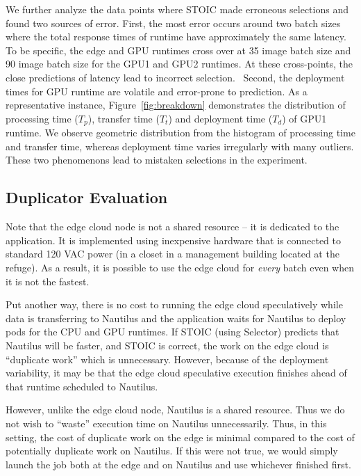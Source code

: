 We further analyze the data points where STOIC made erroneous selections and found two sources of error. First, the most error occurs around two batch sizes where the total response times of runtime have approximately the same latency. To be specific, the edge and GPU runtimes cross over at 35 image batch size and 90 image batch size for the GPU1 and GPU2 runtimes. At these cross-points, the close predictions of latency lead to incorrect selection.~\cite{ref:stoic2020} Second, the deployment times for GPU runtime are volatile and error-prone to prediction. As a representative instance, Figure~\ref{fig:breakdown} demonstrates the distribution of processing time ($T_p$), transfer time ($T_t$) and deployment time ($T_d$) of GPU1 runtime. We observe geometric distribution from the histogram of processing time and transfer time, whereas deployment time varies irregularly with many outliers. These two phenomenons lead to mistaken selections in the experiment.

\subsection{Duplicator Evaluation}

Note that the edge cloud node is not a shared resource -- it is dedicated to the application. It is implemented using inexpensive hardware that is connected to standard 120 VAC power (in a closet in a management building located at the refuge).
As a result, it is possible to use the edge cloud for \textit{every} batch even when it is not the fastest.  

Put another way, there is no cost to running the edge cloud speculatively while data is transferring to Nautilus and the application waits for Nautilus to deploy pods for the CPU and GPU runtimes. If STOIC (using Selector) predicts that Nautilus will be faster, and STOIC is correct, the work on the edge cloud is ``duplicate work'' which is unnecessary. However, because of the deployment variability, it may be that the edge cloud speculative execution finishes ahead of that runtime scheduled to Nautilus.

However, unlike the edge cloud node, Nautilus is a shared resource.  Thus we do not wish to ``waste'' execution time on Nautilus unnecessarily. Thus, in this setting, the cost of duplicate work on the edge is minimal compared to the cost of potentially duplicate work on Nautilus. If this were not true, we would simply launch the job both at the edge and on Nautilus and use whichever finished first.

